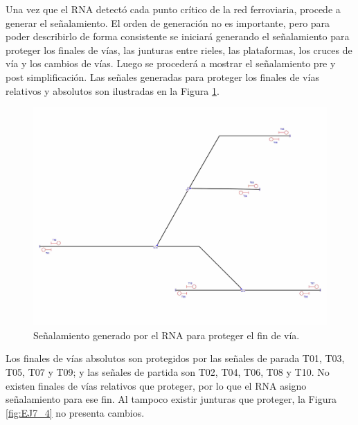 	Una vez que el RNA detectó cada punto crítico de la red ferroviaria, procede a generar el señalamiento. El orden de generación no es importante, pero para poder describirlo de forma consistente se iniciará generando el señalamiento para proteger los finales de vías, las junturas entre rieles, las plataformas, los cruces de vía y los cambios de vías. Luego se procederá a mostrar el señalamiento pre y post simplificación. Las señales generadas para proteger los finales de vías relativos y absolutos son ilustradas en la Figura \ref{fig:EJ7_3}.
	
	\begin{figure}[H]
		\centering
		\includegraphics[width=1\textwidth]{resultados-obtenidos/ejemplo7/images/7_step1.png}
		\centering\caption{Señalamiento generado por el RNA para proteger el fin de vía.}
		\label{fig:EJ7_3}
	\end{figure}
	
	Los finales de vías absolutos son protegidos por las señales de parada T01, T03, T05, T07 y T09; y las señales de partida son T02, T04, T06, T08 y T10. No existen finales de vías relativos que proteger, por lo que el RNA asigno señalamiento para ese fin. Al tampoco existir junturas que proteger, la Figura \ref{fig:EJ7_4} no presenta cambios.
	
